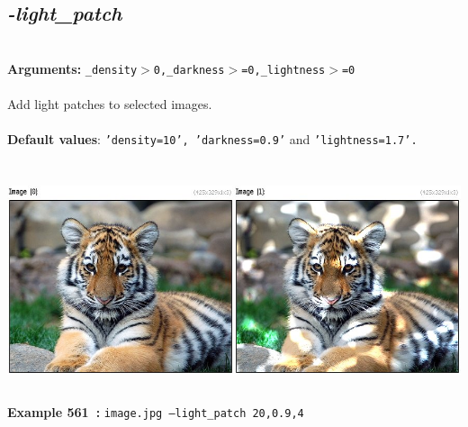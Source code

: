 \documentclass[a4paper,11pt,twoside]{book}
\begin{document}
\subsection{\emph{-light\_patch} }\vspace*{-0.5em}
~\\\textbf{Arguments: } 
{\small \texttt{\_density$>$0,\_darkness$>$=0,\_lightness$>$=0}}\\~\\
Add light patches to selected images.
~\\~\\\textbf{Default values}: {\small \texttt{'density=10', 'darkness=0.9'} and \texttt{'lightness=1.7'.}}
\begin{center}\includegraphics[keepaspectratio=true,height=7cm,width=\textwidth]{img/gmic_def561.jpg}\\
{\footnotesize \textbf{Example 561~:} \texttt{image.jpg --light\_patch 20,0.9,4}}
\end{center}
\end{document}
